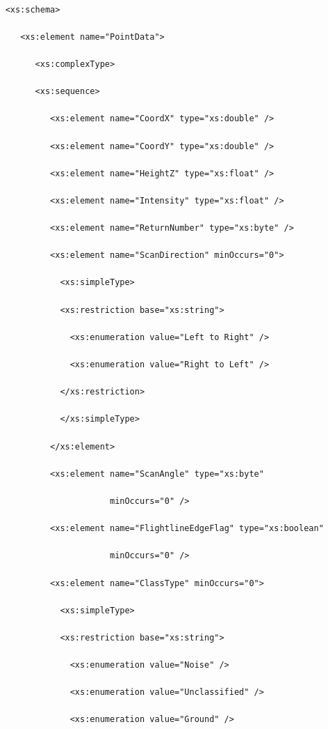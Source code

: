    

   \noindent


   \begin{verbatim}

    <xs:schema>

       <xs:element name="PointData">

          <xs:complexType>

          <xs:sequence>

             <xs:element name="CoordX" type="xs:double" />

             <xs:element name="CoordY" type="xs:double" />

             <xs:element name="HeightZ" type="xs:float" />

             <xs:element name="Intensity" type="xs:float" />

             <xs:element name="ReturnNumber" type="xs:byte" />

             <xs:element name="ScanDirection" minOccurs="0">

               <xs:simpleType>

               <xs:restriction base="xs:string">

                 <xs:enumeration value="Left to Right" />

                 <xs:enumeration value="Right to Left" />

               </xs:restriction>

               </xs:simpleType>

             </xs:element>

             <xs:element name="ScanAngle" type="xs:byte"

                         minOccurs="0" />

             <xs:element name="FlightlineEdgeFlag" type="xs:boolean"

                         minOccurs="0" />

             <xs:element name="ClassType" minOccurs="0">

               <xs:simpleType>

               <xs:restriction base="xs:string">

                 <xs:enumeration value="Noise" />

                 <xs:enumeration value="Unclassified" />

                 <xs:enumeration value="Ground" />


\end{verbatim}
